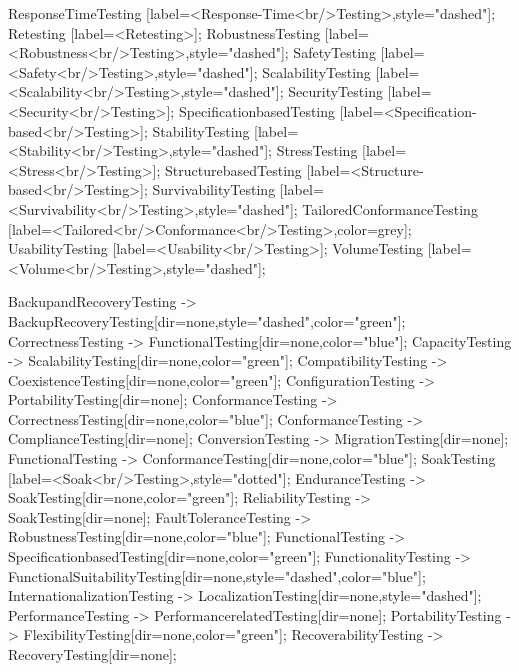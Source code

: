 \documentclass{article}
\begin{document}
{ResponseTimeTesting [label=<Response-Time<br/>Testing>,style="dashed"];
Retesting [label=<Retesting>];
RobustnessTesting [label=<Robustness<br/>Testing>,style="dashed"];
SafetyTesting [label=<Safety<br/>Testing>,style="dashed"];
ScalabilityTesting [label=<Scalability<br/>Testing>,style="dashed"];
SecurityTesting [label=<Security<br/>Testing>];
SpecificationbasedTesting [label=<Specification-based<br/>Testing>];
StabilityTesting [label=<Stability<br/>Testing>,style="dashed"];
StressTesting [label=<Stress<br/>Testing>];
StructurebasedTesting [label=<Structure-based<br/>Testing>];
SurvivabilityTesting [label=<Survivability<br/>Testing>,style="dashed"];
TailoredConformanceTesting [label=<Tailored<br/>Conformance<br/>Testing>,color=grey];
UsabilityTesting [label=<Usability<br/>Testing>];
VolumeTesting [label=<Volume<br/>Testing>,style="dashed"];

BackupandRecoveryTesting -> BackupRecoveryTesting[dir=none,style="dashed",color="green"];
CorrectnessTesting -> FunctionalTesting[dir=none,color="blue"];
CapacityTesting -> ScalabilityTesting[dir=none,color="green"];
CompatibilityTesting -> CoexistenceTesting[dir=none,color="green"];
ConfigurationTesting -> PortabilityTesting[dir=none];
ConformanceTesting -> CorrectnessTesting[dir=none,color="blue"];
ConformanceTesting -> ComplianceTesting[dir=none];
ConversionTesting -> MigrationTesting[dir=none];
FunctionalTesting -> ConformanceTesting[dir=none,color="blue"];
SoakTesting [label=<Soak<br/>Testing>,style="dotted"];
EnduranceTesting -> SoakTesting[dir=none,color="green"];
ReliabilityTesting -> SoakTesting[dir=none];
FaultToleranceTesting -> RobustnessTesting[dir=none,color="blue"];
FunctionalTesting -> SpecificationbasedTesting[dir=none,color="green"];
FunctionalityTesting -> FunctionalSuitabilityTesting[dir=none,style="dashed",color="blue"];
InternationalizationTesting -> LocalizationTesting[dir=none,style="dashed"];
PerformanceTesting -> PerformancerelatedTesting[dir=none];
PortabilityTesting -> FlexibilityTesting[dir=none,color="green"];
RecoverabilityTesting -> RecoveryTesting[dir=none];

}
\end{document}
